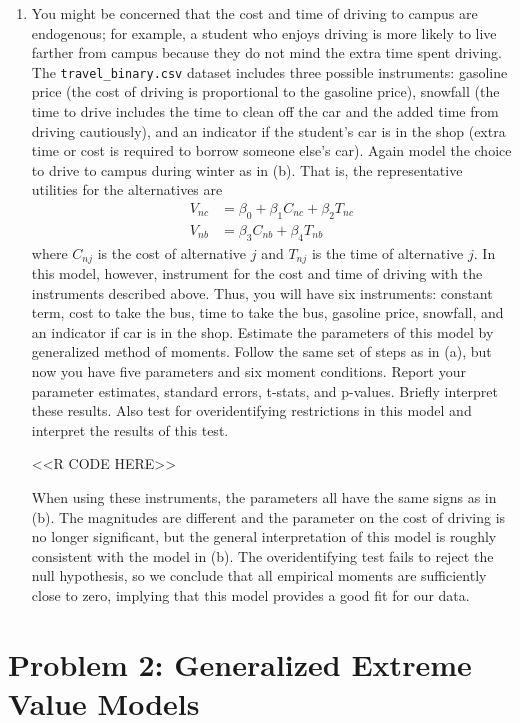 \documentclass[11pt,letterpaper]{article}
\begin{document}
\begin{enumerate}[label=\alph*., leftmargin=*]
	\item You might be concerned that the cost and time of driving to campus are endogenous; for example, a student who enjoys driving is more likely to live farther from campus because they do not mind the extra time spent driving. The \texttt{travel\_binary.csv} dataset includes three possible instruments: gasoline price (the cost of driving is proportional to the gasoline price), snowfall (the time to drive includes the time to clean off the car and the added time from driving cautiously), and an indicator if the student's car is in the shop (extra time or cost is required to borrow someone else's car). Again model the choice to drive to campus during winter as in (b). That is, the representative utilities for the alternatives are
	\begin{align*}
		V_{nc} &= \beta_0 + \beta_1 C_{nc} + \beta_2 T_{nc} \\
		V_{nb} &= \beta_3 C_{nb} + \beta_4 T_{nb}
	\end{align*}
	where $C_{nj}$ is the cost of alternative $j$ and $T_{nj}$ is the time of alternative $j$. In this model, however, instrument for the cost and time of driving with the instruments described above. Thus, you will have six instruments: constant term, cost to take the bus, time to take the bus, gasoline price, snowfall, and an indicator if car is in the shop. Estimate the parameters of this model by generalized method of moments. Follow the same set of steps as in (a), but now you have five parameters and six moment conditions. Report your parameter estimates, standard errors, t-stats, and p-values. Briefly interpret these results. Also test for overidentifying restrictions in this model and interpret the results of this test.

	<<R CODE HERE>>

	When using these instruments, the parameters all have the same signs as in (b). The magnitudes are different and the parameter on the cost of driving is no longer significant, but the general interpretation of this model is roughly consistent with the model in (b). The overidentifying test fails to reject the null hypothesis, so we conclude that all empirical moments are sufficiently close to zero, implying that this model provides a good fit for our data.
\end{enumerate}

\section*{Problem 2: Generalized Extreme Value Models}
\end{document}
